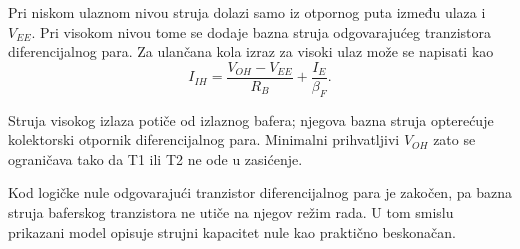 Pri niskom ulaznom nivou struja dolazi samo iz otpornog puta između ulaza i $V_{EE}$. Pri visokom nivou tome se dodaje bazna struja odgovarajućeg tranzistora diferencijalnog para. Za ulančana kola izraz za visoki ulaz može se napisati kao
\[I_{IH}=\frac{V_{OH}-V_{EE}}{R_B}+\frac{I_E}{\beta_F}.\]

Struja visokog izlaza potiče od izlaznog bafera; njegova bazna struja opterećuje kolektorski otpornik diferencijalnog para. Minimalni prihvatljivi $V_{OH}$ zato se ograničava tako da T1 ili T2 ne ode u zasićenje.

Kod logičke nule odgovarajući tranzistor diferencijalnog para je zakočen, pa bazna struja baferskog tranzistora ne utiče na njegov režim rada. U tom smislu prikazani model opisuje strujni kapacitet nule kao praktično beskonačan.
